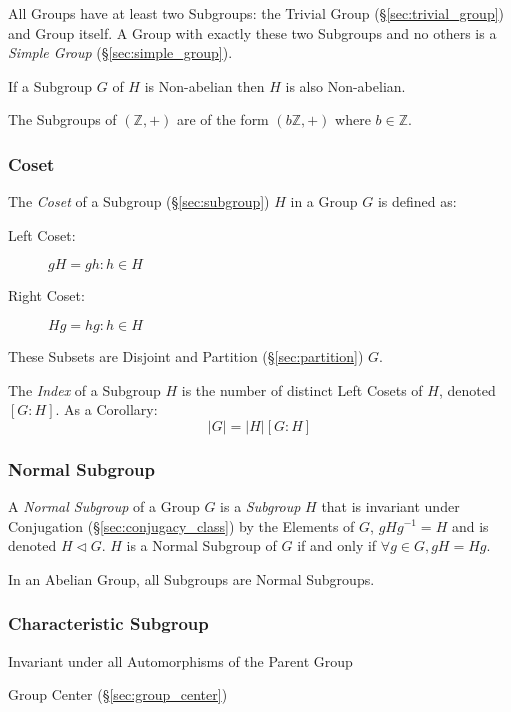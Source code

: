 All Groups have at least two Subgroups: the Trivial Group
(\S\ref{sec:trivial_group}) and Group itself. A Group with exactly
these two Subgroups and no others is a \emph{Simple Group}
(\S\ref{sec:simple_group}).

If a Subgroup $G$ of $H$ is Non-abelian then $H$ is also Non-abelian.

The Subgroups of $(\mathbb{Z},+)$ are of the form $(b\mathbb{Z},+)$
where $b \in \mathbb{Z}$.



\subsubsection{Coset}\label{sec:coset}

The \emph{Coset} of a Subgroup (\S\ref{sec:subgroup}) $H$ in a Group
$G$ is defined as:
\begin{description}
\item[Left Coset:] $gH = {gh : h \in H}$
\item[Right Coset:] $Hg = {hg : h \in H}$
\end{description}
These Subsets are Disjoint and Partition (\S\ref{sec:partition}) $G$.

The \emph{Index} of a Subgroup $H$ is the number of distinct Left
Cosets of $H$, denoted $[G:H]$. As a Corollary:
\[
    |G| = |H|[G:H]
\]



\subsubsection{Normal Subgroup}\label{sec:normal_subgroup}

A \emph{Normal Subgroup} of a Group $G$ is a \emph{Subgroup} $H$ that
is invariant under Conjugation (\S\ref{sec:conjugacy_class}) by the
Elements of $G$, $gHg^{-1} = H$ and is denoted $H \triangleleft G$.
$H$ is a Normal Subgroup of $G$ if and only if $\forall g \in G, gH =
Hg$.

In an Abelian Group, all Subgroups are Normal Subgroups.



\subsubsection{Characteristic Subgroup}
\label{sec:characteristic_subgroup}

Invariant under all Automorphisms of the Parent Group

Group Center (\S\ref{sec:group_center})



